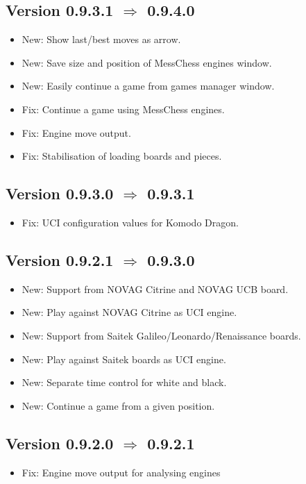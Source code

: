 \documentclass[11pt,a4paper]{article}
\begin{document}
\subsection*{Version 0.9.3.1 $\Rightarrow$  0.9.4.0}
\begin{itemize}
	\item {\color{blue}New}: Show last/best moves as arrow.
	\item {\color{blue}New}: Save size and position of MessChess engines window.	
	\item {\color{blue}New}: Easily continue a game from games manager window.		
	\item {\color{red}Fix}: Continue a game using MessChess engines.
    \item {\color{red}Fix}: Engine move output.
    \item {\color{red}Fix}: Stabilisation of loading boards and pieces.
\end{itemize}

\subsection*{Version 0.9.3.0 $\Rightarrow$  0.9.3.1}
\begin{itemize}
	\item {\color{red}Fix}: UCI configuration values for Komodo Dragon.
\end{itemize}

\subsection*{Version 0.9.2.1 $\Rightarrow$  0.9.3.0}
\begin{itemize}
	\item {\color{blue}New}: Support from NOVAG Citrine and NOVAG UCB board.
	\item {\color{blue}New}: Play against NOVAG Citrine as UCI engine.
	\item {\color{blue}New}: Support from Saitek Galileo/Leonardo/Renaissance boards.
	\item {\color{blue}New}: Play against Saitek boards as UCI engine.
	\item {\color{blue}New}: Separate time control for white and black.
	\item {\color{blue}New}: Continue a game from a given position.
\end{itemize}

\subsection*{Version 0.9.2.0 $\Rightarrow$  0.9.2.1}
\begin{itemize}
	\item {\color{red}Fix}: Engine move output for analysing engines
\end{itemize}
\end{document}
